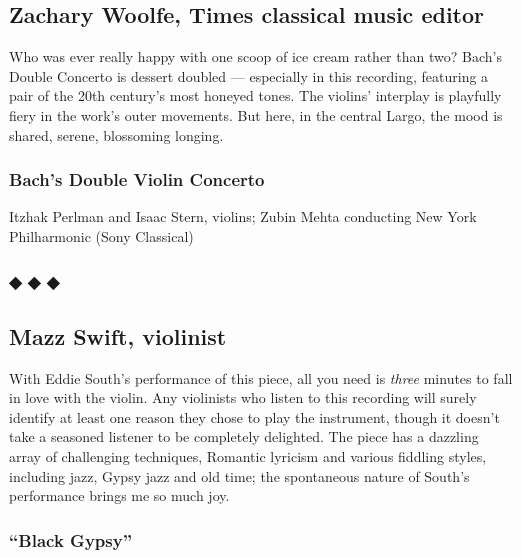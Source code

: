 \hypertarget{zachary-woolfe-times-classical-music-editor}{%
\subsection{Zachary Woolfe, Times classical music
editor}\label{zachary-woolfe-times-classical-music-editor}}

Who was ever really happy with one scoop of ice cream rather than two?
Bach's Double Concerto is dessert doubled --- especially in this
recording, featuring a pair of the 20th century's most honeyed tones.
The violins' interplay is playfully fiery in the work's outer movements.
But here, in the central Largo, the mood is shared, serene, blossoming
longing.

\hypertarget{bachs-double-violin-concerto}{%
\subsubsection{Bach's Double Violin
Concerto}\label{bachs-double-violin-concerto}}

Itzhak Perlman and Isaac Stern, violins; Zubin Mehta conducting New York
Philharmonic (Sony Classical)

\hypertarget{---2}{%
\subsubsection{◆ ◆ ◆}\label{---2}}

\hypertarget{mazz-swift-violinist}{%
\subsection{Mazz Swift, violinist}\label{mazz-swift-violinist}}

With Eddie South's performance of this piece, all you need is
\emph{three} minutes to fall in love with the violin. Any violinists who
listen to this recording will surely identify at least one reason they
chose to play the instrument, though it doesn't take a seasoned listener
to be completely delighted. The piece has a dazzling array of
challenging techniques, Romantic lyricism and various fiddling styles,
including jazz, Gypsy jazz and old time; the spontaneous nature of
South's performance brings me so much joy.

\hypertarget{black-gypsy}{%
\subsubsection{``Black Gypsy''}\label{black-gypsy}}

